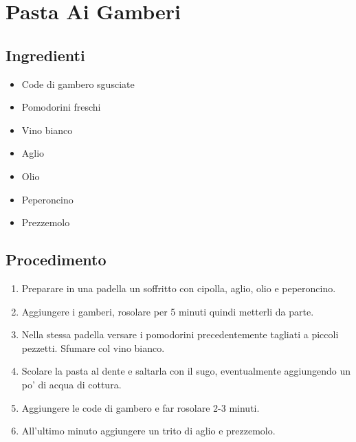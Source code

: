 \section{Pasta Ai Gamberi}
\subsection{Ingredienti}
\begin{itemize}
\item Code di gambero sgusciate  
\item Pomodorini freschi  
\item Vino bianco  
\item Aglio  
\item Olio  
\item Peperoncino  
\item Prezzemolo
\end{itemize}
\subsection{Procedimento}
\begin{enumerate}
\item  Preparare in una padella un soffritto con cipolla, aglio, olio e peperoncino.  
\item  Aggiungere i gamberi, rosolare per 5 minuti quindi metterli da parte.  
\item  Nella stessa padella versare i pomodorini precedentemente tagliati a piccoli pezzetti. Sfumare col vino bianco.  
\item  Scolare la pasta al dente e saltarla con il sugo, eventualmente aggiungendo un po' di acqua di cottura.  
\item  Aggiungere le code di gambero e far rosolare 2-3 minuti.  
\item  All'ultimo minuto aggiungere un trito di aglio e prezzemolo.
\end{enumerate}
